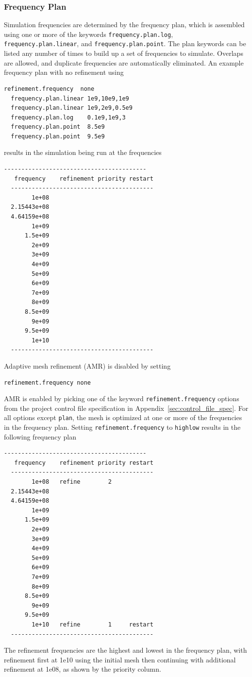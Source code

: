 \documentclass[titlepage]{article}
\renewcommand\_{\textunderscore\linebreak[1]}
\begin{document}
\subsubsection{Frequency Plan}

Simulation frequencies are determined by the frequency plan, which is assembled using one or more of the keywords \texttt{frequency.plan.log}, \texttt{frequency.plan.linear}, and \texttt{frequency.plan.point}.  The plan keywords can be listed any number of times to build up a set of frequencies to simulate.  Overlaps are allowed, and duplicate frequencies are automatically eliminated.  An example frequency plan with no refinement using
\begin{Verbatim}[fontsize=\small]
  refinement.frequency  none
  frequency.plan.linear 1e9,10e9,1e9
  frequency.plan.linear 1e9,2e9,0.5e9
  frequency.plan.log    0.1e9,1e9,3
  frequency.plan.point  8.5e9
  frequency.plan.point  9.5e9
\end{Verbatim}
\noindent results in the simulation being run at the frequencies 
\begin{Verbatim}[fontsize=\small]
  -----------------------------------------
   frequency    refinement priority restart
  -----------------------------------------
        1e+08
  2.15443e+08
  4.64159e+08
        1e+09
      1.5e+09
        2e+09
        3e+09
        4e+09
        5e+09
        6e+09
        7e+09
        8e+09
      8.5e+09
        9e+09
      9.5e+09
        1e+10
  -----------------------------------------
\end{Verbatim}

Adaptive mesh refinement (AMR) is disabled by setting 
\begin{Verbatim}[fontsize=\small]
  refinement.frequency none
\end{Verbatim}
AMR is enabled by picking one of the keyword \texttt{refinement.frequency} options from the project control file specification in Appendix~\ref{sec:control_file_spec}.  For all options except \texttt{plan}, the mesh is optimized at one or more of the frequencies in the frequency plan.  Setting \texttt{refinement.frequency} to \texttt{highlow} results in the following frequency plan
\begin{Verbatim}[fontsize=\small]
  -----------------------------------------
   frequency    refinement priority restart
  -----------------------------------------
        1e+08   refine        2
  2.15443e+08
  4.64159e+08
        1e+09
      1.5e+09
        2e+09
        3e+09
        4e+09
        5e+09
        6e+09
        7e+09
        8e+09
      8.5e+09
        9e+09
      9.5e+09
        1e+10   refine        1     restart
  -----------------------------------------
\end{Verbatim}
\noindent The refinement frequencies are the highest and lowest in the frequency plan, with refinement first at 1e10 using the initial mesh then continuing with additional refinement at 1e08, as shown by the priority column.
\end{document}
